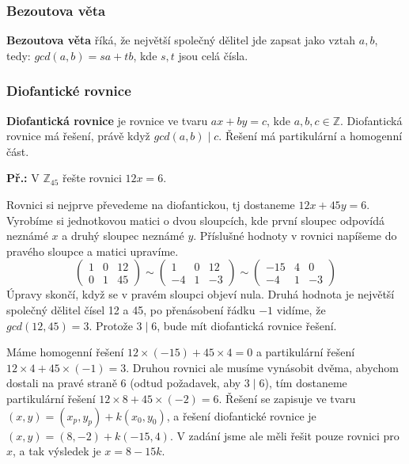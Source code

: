 \documentclass[10pt,a4paper]{article}
\begin{document}
\subsubsection{Bezoutova věta}
\textbf{Bezoutova věta} říká, že největší společný dělitel jde zapsat jako vztah
$a,b$, tedy: $gcd(a, b) = sa + tb$, kde $s,t$ jsou celá čísla.

\subsubsection{Diofantické rovnice}
\textbf{Diofantická rovnice} je rovnice ve tvaru $ax + by = c$, kde $a,b,c \in
\mathbb{Z}$. Diofantická rovnice má řešení, právě když $gcd(a,b) \mid c$. Řešení
má partikulární a homogenní část.

\begin{exercise}
    
\textbf{Př.:} V $\mathbb{Z}_{45}$ řešte rovnici $12x = 6$.

Rovnici si nejprve převedeme na diofantickou, tj dostaneme $12x + 45y = 6$.
Vyrobíme si jednotkovou matici o dvou sloupcích, kde první sloupec odpovídá
neznámé $x$ a druhý sloupec neznámé $y$. Příslušné hodnoty v rovnici napíšeme do
pravého sloupce a matici upravíme.
\[ \left( \begin{array}{cc|c}
1 & 0 & 12\\
0 & 1 & 45 \end{array} \right)
%
\sim
%
\left( \begin{array}{cc|c}
1 & 0 & 12\\
-4 & 1 & -3 \end{array} \right)
%
\sim
%
\left( \begin{array}{cc|c}
-15 & 4 & 0\\
-4 & 1 & -3 \end{array} \right) \] Úpravy skončí, když se v pravém sloupci
objeví nula. Druhá hodnota je největší společný dělitel čísel 12 a 45, po
přenásobení řádku $-1$ vidíme, že $gcd(12,45)=3$. Protože $3 \mid 6$, bude mít
diofantická rovnice řešení.

Máme homogenní řešení $12\times(-15) + 45\times 4 = 0$ a partikulární řešení
$12\times4 + 45\times(-1) = 3$. Druhou rovnici ale musíme vynásobit dvěma,
abychom dostali na pravé straně 6 (odtud požadavek, aby $3\mid6$), tím dostaneme
partikulární řešení $12\times8 + 45\times(-2) = 6$. Řešení se zapisuje ve tvaru
$(x,y) = (x_p,y_p) + k(x_0,y_0)$, a řešení diofantické rovnice je $(x,y) = (8,
-2) + k(-15,4)$. V zadání jsme ale měli řešit pouze rovnici pro $x$, a tak
výsledek je $x = 8 - 15k$.
\end{exercise}
\end{document}
